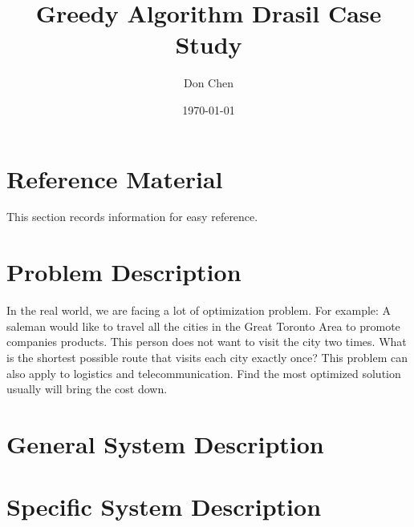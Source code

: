 \documentclass[12pt]{article}
\title{Greedy Algorithm Drasil Case Study}
\author{Don Chen}
\date{\today}
\begin{document}
\tableofcontents

\section{Reference Material}
This section records information for easy reference.

\section{Problem Description}
In the real world, we are facing a lot of optimization problem. For example:
A saleman would like to travel all the cities in the Great Toronto Area to promote companies products.
This person does not want to visit the city two times. What is the shortest possible route that visits 
each city exactly once? This problem can also apply to logistics and telecommunication.
Find the most optimized solution usually will bring the cost down.

\section{General System Description}

\section{Specific System Description}
\end{document}
